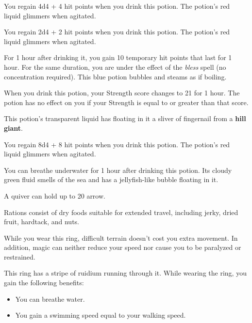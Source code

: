 \documentclass[10pt,a4paper,twoside,fancy,bg=print,twocolumn,openany,nodeprecatedcode]{dndbook}
\begin{document}
You regain 4d4 + 4 hit points when you drink this potion. The potion's red liquid glimmers when agitated.

You regain 2d4 + 2 hit points when you drink this potion. The potion's red liquid glimmers when agitated.

For 1 hour after drinking it, you gain 10 temporary hit points that last for 1 hour. For the same duration, you are under the effect of the \textit{bless} spell (no concentration required). This blue potion bubbles and steams as if boiling.

When you drink this potion, your Strength score changes to 21 for 1 hour. The potion has no effect on you if your Strength is equal to or greater than that score.

This potion's transparent liquid has floating in it a sliver of fingernail from a \textbf{hill giant}.

You regain 8d4 + 8 hit points when you drink this potion. The potion's red liquid glimmers when agitated.

You can breathe underwater for 1 hour after drinking this potion. Its cloudy green fluid smells of the sea and has a jellyfish-like bubble floating in it.

A quiver can hold up to 20 arrow.

Rations consist of dry foods suitable for extended travel, including jerky, dried fruit, hardtack, and nuts.

While you wear this ring, difficult terrain doesn't cost you extra movement. In addition, magic can neither reduce your speed nor cause you to be paralyzed or restrained.

This ring has a stripe of ruidium running through it. While wearing the ring, you gain the following benefits:


\begin{itemize}
\item You can breathe water.
\item You gain a swimming speed equal to your walking speed.
\end{itemize}
\end{document}
